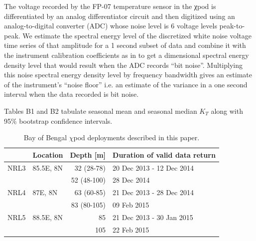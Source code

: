 \documentclass[twocol]{ametsoc}
\begin{document}
\appendix[B]
The voltage recorded by the FP-07 temperature sensor in the χpod is differentiated by an analog differentiator circuit and then digitized using an analog-to-digital converter (ADC) whose noise level is 6 voltage levels peak-to-peak.
We estimate the spectral energy level of the discretized white noise voltage time series of that amplitude for a 1 second subset of data and combine it with the instrument calibration coefficients as in \cite{Becherer2017} to get a dimensional spectral energy density level that would result when the ADC records ``bit noise''.
Multiplying this noise spectral energy density level by frequency bandwidth gives an estimate of the instrument's ``noise floor'' i.e. an estimate of the variance in a one second interval when the data recorded is bit noise.

\appendix[C]
Tables B1 and B2 tabulate seasonal mean and seasonal median \(K_T\) along with 95\% bootstrap confidence intervals.




\begin{table}[t]
\caption{\label{tab:pods}
Bay of Bengal \(\chi\)pod deployments described in this paper.}
\centering
\begin{tabular*}{0.7\textwidth}{@{\extracolsep\fill}llrl}
\toprule
 & Location & Depth [m] & Duration of valid data return\\
\midrule
NRL3 & 85.5E, 8N & 32 (28-78) & 20 Dec 2013 - 12 Dec 2014\\
 &  & 52 (48-100) & \phantom{20 Dec 2013 -} 28 Dec 2014\\
\midrule
NRL4 & 87E, 8N & 63 (60-85) & 21 Dec 2013 - 28 Dec 2014\\
 &  & 83 (80-105) & \phantom{21 Dec 2013 -} 09 Feb 2015\\
\midrule
NRL5 & 88.5E, 8N & 85 & 21 Dec 2013 - 30 Jan 2015\\
 &  & 105 & \phantom{21 Dec 2013 -} 22 Feb 2015\\
\bottomrule
\end{tabular*}
\end{table}

\begin{table}
\label{tab:means}
\footnotesize
\centering
{}

\end{table}
\end{document}
